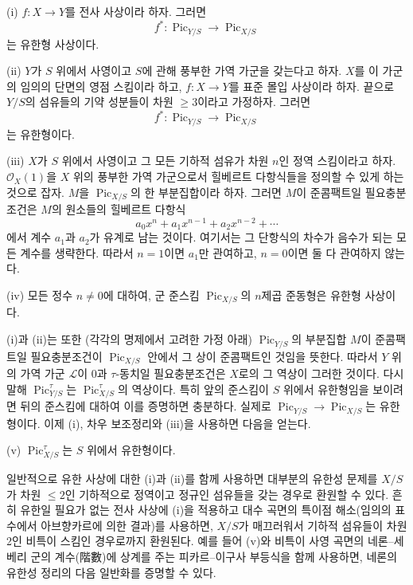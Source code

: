\documentclass[11pt,twoside,openany]{book}
\numberwithin{equation}{section}
\newcommand{\sourceunit}{front}
\newcommand{\src}[1]{%
  \phantomsection\hypertarget{src:\sourceunit:#1}{}%
  \marginpar{\raggedleft\footnotesize\sffamily #1}%
}
\theoremstyle{plain}
\theoremstyle{definition}
\theoremstyle{remark}
\begin{document}
\medskip
\noindent(i) $f:X\longrightarrow Y$를 전사 사상이라 하자. 그러면
\[
f^*: \operatorname{Pic}_{Y/S}\longrightarrow\operatorname{Pic}_{X/S}
\]
는 유한형 사상이다.

\src{304}
\noindent(ii) $Y$가 $S$ 위에서 사영이고 $S$에 관해 풍부한 가역 가군을
갖는다고 하자. $X$를 이 가군의 임의의 단면의 영점 스킴이라 하고,
$f:X\longrightarrow Y$를 표준 몰입 사상이라 하자. 끝으로 $Y/S$의
섬유들의 기약 성분들이 차원 $\geq3$이라고 가정하자. 그러면
\[
f^*: \operatorname{Pic}_{Y/S}\longrightarrow\operatorname{Pic}_{X/S}
\]
는 유한형이다.

\noindent(iii) $X$가 $S$ 위에서 사영이고 그 모든 기하적 섬유가 차원
$n$인 정역 스킴이라고 하자. $\mathcal O_X(1)$을 $X$ 위의 풍부한 가역
가군으로서 힐베르트 다항식들을 정의할 수 있게 하는 것으로 잡자. $M$을
$\operatorname{Pic}_{X/S}$의 한 부분집합이라 하자. 그러면 $M$이
준콤팩트일 필요충분조건은 $M$의 원소들의 힐베르트 다항식
\[
a_0x^n+a_1x^{n-1}+a_2x^{n-2}+\cdots
\]
에서 계수 $a_1$과 $a_2$가 유계로 남는 것이다. 여기서는 그 단항식의
차수가 음수가 되는 모든 계수를 생략한다. 따라서 $n=1$이면 $a_1$만
관여하고, $n=0$이면 둘 다 관여하지 않는다.

\noindent(iv) 모든 정수 $n\neq0$에 대하여, 군 준스킴
$\operatorname{Pic}_{X/S}$의 $n$제곱 준동형은 유한형 사상이다.

(i)과 (ii)는 또한 (각각의 명제에서 고려한 가정 아래)
$\operatorname{Pic}_{Y/S}$의 부분집합 $M$이 준콤팩트일 필요충분조건이
$\operatorname{Pic}_{X/S}$ 안에서 그 상이 준콤팩트인 것임을 뜻한다.
따라서 $Y$ 위의 가역 가군 $\mathcal L$이 $0$과 $\tau$-동치일
필요충분조건은 $X$로의 그 역상이 그러한 것이다. 다시 말해
$\operatorname{Pic}_{Y/S}^\tau$는
$\operatorname{Pic}_{X/S}^\tau$의 역상이다. 특히 앞의 준스킴이 $S$
위에서 유한형임을 보이려면 뒤의 준스킴에 대하여 이를 증명하면 충분하다.
실제로 $\operatorname{Pic}_{Y/S}\longrightarrow
\operatorname{Pic}_{X/S}$는 유한형이다. 이제 (i), 차우 보조정리와
(iii)을 사용하면 다음을 얻는다.

\medskip
\noindent(v) $\operatorname{Pic}_{X/S}^\tau$는 $S$ 위에서 유한형이다.

일반적으로 유한 사상에 대한 (i)과 (ii)를 함께 사용하면 대부분의 유한성
문제를 $X/S$가 차원 $\leq2$인 기하적으로 정역이고 정규인 섬유들을 갖는
경우로 환원할 수 있다. 흔히 유한일 필요가 없는 전사 사상에 (i)을
적용하고 대수 곡면의 특이점 해소(임의의 표수에서 아브향카르에 의한
결과)를 사용하면, $X/S$가 매끄러워서 기하적 섬유들이 차원 2인
비특이 스킴인 경우로까지 환원된다. 예를 들어 (v)와 비특이 사영 곡면의
네론--세베리 군의 계수(階數)에 상계를 주는 피카르--이구사 부등식을
함께 사용하면, 네론의 유한성 정리의 다음 일반화를 증명할 수 있다.
\end{document}
